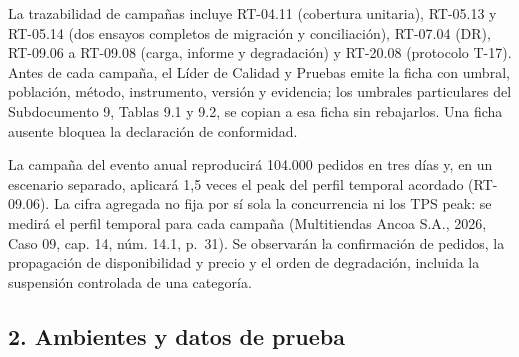 \documentclass[11pt]{article}
\begin{document}
La trazabilidad de campañas incluye RT-04.11 (cobertura unitaria), RT-05.13 y RT-05.14 (dos ensayos completos de migración y conciliación), RT-07.04 (DR), RT-09.06 a RT-09.08 (carga, informe y degradación) y RT-20.08 (protocolo T-17). Antes de cada campaña, el Líder de Calidad y Pruebas emite la ficha con umbral, población, método, instrumento, versión y evidencia; los umbrales particulares del Subdocumento 9, Tablas 9.1 y 9.2, se copian a esa ficha sin rebajarlos. Una ficha ausente bloquea la declaración de conformidad.

La campaña del evento anual reproducirá 104.000 pedidos en tres días y, en un escenario separado, aplicará 1,5 veces el peak del perfil temporal acordado (RT-09.06). La cifra agregada no fija por sí sola la concurrencia ni los TPS peak: se medirá el perfil temporal para cada campaña (Multitiendas Ancoa S.A., 2026, Caso 09, cap. 14, núm. 14.1, p.~31). Se observarán la confirmación de pedidos, la propagación de disponibilidad y precio y el orden de degradación, incluida la suspensión controlada de una categoría.

\subsection{2. Ambientes y datos de prueba}\label{t13-ambientes-y-datos-de-prueba}
\end{document}
